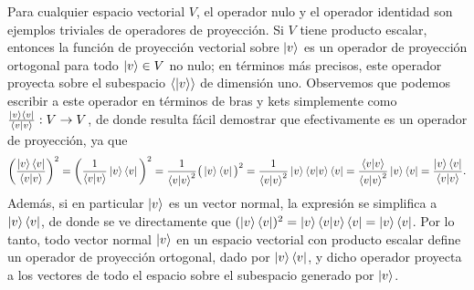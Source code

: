 \documentclass[12pt,libertine]{book}
\begin{document}
\vspace{3mm}
Para cualquier espacio vectorial $V$, el operador nulo y el operador identidad son ejemplos triviales de operadores de proyección. Si $V$ tiene producto escalar, entonces la función de proyección vectorial sobre $\ket{v}$ es un operador de proyección ortogonal para todo $\ket{v}\in V$ no nulo; en términos más precisos, este operador proyecta sobre el subespacio $\langle \ket{v} \rangle$ de dimensión uno. Observemos que podemos escribir a este operador en términos de bras y kets simplemente como $\frac{\ket{v}\bra{v}}{\braket{v|v}}:V\to V$, de donde resulta fácil demostrar que efectivamente es un operador de proyección, ya que \[
    \bigg( \frac{\ket{v}\bra{v}}{\braket{v|v}}\bigg)^2=\bigg(\frac{1}{\braket{v|v}}\ket{v}\bra{v}\bigg)^2=\frac{1}{\braket{v|v}^2}\big(\ket{v}\bra{v}\big)^2=\frac{1}{\braket{v|v}^2}\ket{v}\braket{v|v}\bra{v}=\frac{\braket{v|v}}{\braket{v|v}^2}\ket{v}\bra{v}=\frac{\ket{v}\bra{v}}{\braket{v|v}}.
\] Además, si en particular $\ket{v}$ es un vector normal, la expresión se simplifica a $\ket{v}\bra{v}$, de donde se ve directamente que $(\ket{v}\bra{v})^2=\ket{v}\braket{v|v}\bra{v}=\ket{v}\bra{v}$. Por lo tanto, todo vector normal $\ket{v}$ en un espacio vectorial con producto escalar define un operador de proyección ortogonal, dado por $\ket{v}\bra{v}$, y dicho operador proyecta a los vectores de todo el espacio sobre el subespacio generado por $\ket{v}$.
\end{document}
